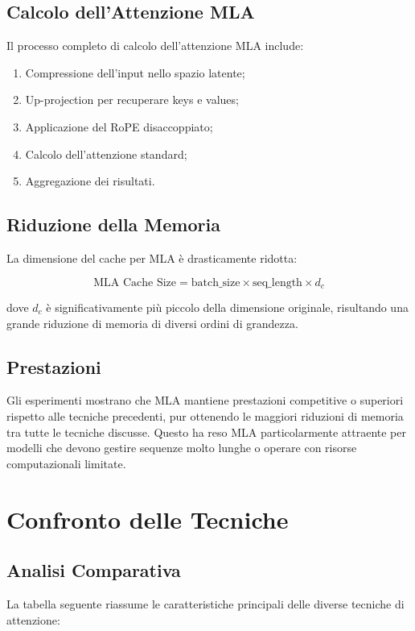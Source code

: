 \subsection{Calcolo dell'Attenzione MLA}
Il processo completo di calcolo dell'attenzione MLA include:

\begin{enumerate}
    \item Compressione dell'input nello spazio latente;
    \item Up-projection per recuperare keys e values;
    \item Applicazione del RoPE disaccoppiato;
    \item Calcolo dell'attenzione standard;
    \item Aggregazione dei risultati.
\end{enumerate}

\subsection{Riduzione della Memoria}
La dimensione del cache per MLA è drasticamente ridotta:

\[
    \text{MLA Cache Size} = \text{batch\_size} \times \text{seq\_length} \times d_c
\]

dove $d_c$ è significativamente più piccolo della dimensione originale, risultando una grande riduzione di memoria di diversi ordini di grandezza.

\subsection{Prestazioni}
Gli esperimenti mostrano che MLA mantiene prestazioni competitive o superiori rispetto alle tecniche precedenti, pur ottenendo le maggiori riduzioni di memoria tra tutte le tecniche discusse. Questo ha reso MLA particolarmente attraente per modelli che devono gestire sequenze molto lunghe o operare con risorse computazionali limitate.

\section{Confronto delle Tecniche}

\subsection{Analisi Comparativa}
La tabella seguente riassume le caratteristiche principali delle diverse tecniche di attenzione:

